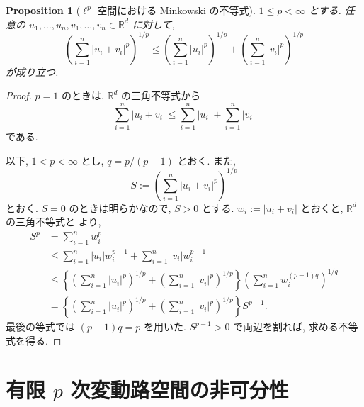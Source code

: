 \documentclass[11pt]{article}
\theoremstyle{breakstyle}
\newtheorem{proposition}[theorem]{Proposition}
\begin{document}
\begin{proposition}[$\ell^p$ 空間における Minkowski の不等式]
    \label{prop:minkowski-lp}
    $1\leq p<\infty$ とする. 任意の
    $u_1,\ldots,u_n,v_1,\ldots,v_n\in\mathbb{R}^d$ に対して,
    \begin{equation*}
        \left(\sum_{i=1}^n|u_i+v_i|^p\right)^{1/p}
        \leq
        \left(\sum_{i=1}^n|u_i|^p\right)^{1/p}
        +
        \left(\sum_{i=1}^n|v_i|^p\right)^{1/p}
    \end{equation*}
    が成り立つ.
\end{proposition}
\begin{proof}
    $p=1$ のときは, $\mathbb{R}^d$ の三角不等式から
    \begin{equation*}
        \sum_{i=1}^n|u_i+v_i|
        \leq \sum_{i=1}^n|u_i|+\sum_{i=1}^n|v_i|
    \end{equation*}
    である.

    以下, $1<p<\infty$ とし, $q=p/(p-1)$ とおく. また,
    \begin{equation*}
        S:=\left(\sum_{i=1}^n|u_i+v_i|^p\right)^{1/p}
    \end{equation*}
    とおく. $S=0$ のときは明らかなので, $S>0$ とする.
    $w_i:=|u_i+v_i|$ とおくと, $\mathbb{R}^d$ の三角不等式と
     より,
    \begin{align*}
        S^p
        &=\sum_{i=1}^n w_i^p\\
        &\leq \sum_{i=1}^n |u_i|w_i^{p-1}
              +\sum_{i=1}^n |v_i|w_i^{p-1}\\
        &\leq
        \left\{
        \left(\sum_{i=1}^n|u_i|^p\right)^{1/p}
        +
        \left(\sum_{i=1}^n|v_i|^p\right)^{1/p}
        \right\}
        \left(\sum_{i=1}^n w_i^{(p-1)q}\right)^{1/q}\\
        &=
        \left\{
        \left(\sum_{i=1}^n|u_i|^p\right)^{1/p}
        +
        \left(\sum_{i=1}^n|v_i|^p\right)^{1/p}
        \right\}S^{p-1}.
    \end{align*}
    最後の等式では $(p-1)q=p$ を用いた. $S^{p-1}>0$ で両辺を割れば,
    求める不等式を得る.
\end{proof}

\section{有限 \texorpdfstring{$p$}{p} 次変動路空間の非可分性}
\label{app:pvar-nonseparability}
\end{document}

